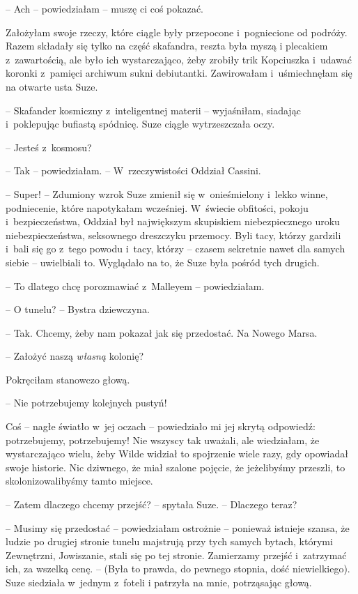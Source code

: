 \documentclass[oneside,polish,11pt,sfheadings]{mwbk}
\begin{document}
-- Ach -- powiedziałam -- muszę ci coś pokazać.

Założyłam swoje rzeczy, które ciągle były przepocone i~pogniecione od
podróży. Razem składały się tylko na część skafandra, reszta była myszą
i plecakiem z~zawartością, ale było ich wystarczająco, żeby zrobiły trik
Kopciuszka i~udawać koronki z~pamięci archiwum sukni debiutantki.
Zawirowałam i~uśmiechnęłam się na otwarte usta Suze.

-- Skafander kosmiczny z~inteligentnej materii -- wyjaśniłam, siadając i~poklepując bufiastą spódnicę. Suze ciągle wytrzeszczała oczy.

-- Jesteś z~kosmosu?

-- Tak -- powiedziałam. -- W~rzeczywistości Oddział Cassini.

-- Super! -- Zdumiony wzrok Suze zmienił się w~onieśmielony i~lekko winne,
podniecenie, które napotykałam wcześniej. W~świecie obfitości, pokoju i~bezpieczeństwa, Oddział był największym skupiskiem niebezpiecznego uroku
niebezpieczeństwa, seksownego dreszczyku przemocy. Byli tacy, którzy
gardzili i~bali się go z~tego powodu i~tacy, którzy -- czasem sekretnie
nawet dla samych siebie -- uwielbiali to. Wyglądało na to, że Suze była
pośród tych drugich.

-- To dlatego chcę porozmawiać z~Malleyem -- powiedziałam.

-- O tunelu? -- Bystra dziewczyna.

-- Tak. Chcemy, żeby nam pokazał jak się przedostać. Na Nowego Marsa.

-- Założyć naszą \textit{własną} kolonię?

Pokręciłam stanowczo głową. 

-- Nie potrzebujemy kolejnych pustyń!

Coś -- nagłe światło w~jej oczach -- powiedziało mi jej skrytą odpowiedź:
potrzebujemy, potrzebujemy! Nie wszyscy tak uważali, ale wiedziałam, że
wystarczająco wielu, żeby Wilde widział to spojrzenie wiele razy, gdy
opowiadał swoje historie. Nic dziwnego, że miał szalone pojęcie, że
jeżelibyśmy przeszli, to skolonizowalibyśmy tamto miejsce.

-- Zatem dlaczego chcemy przejść? -- spytała Suze. -- Dlaczego teraz?

-- Musimy się przedostać -- powiedziałam ostrożnie -- ponieważ istnieje
szansa, że ludzie po drugiej stronie tunelu majstrują przy tych samych
bytach, którymi Zewnętrzni, Jowiszanie, stali się po tej stronie.
Zamierzamy przejść i~zatrzymać ich, za wszelką cenę. -- (Była to prawda,
do pewnego stopnia, dość niewielkiego). Suze siedziała w~jednym z~foteli
i patrzyła na mnie, potrząsając głową.
\end{document}
